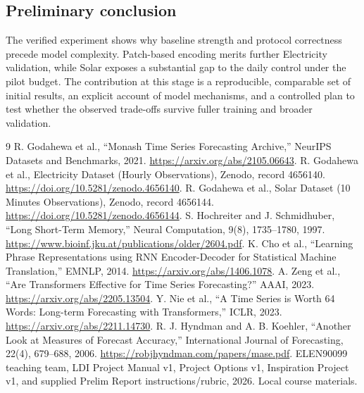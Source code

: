 \documentclass[10pt,a4paper]{article}
\begin{document}
\subsection{Preliminary conclusion}
The verified experiment shows why baseline strength and protocol correctness precede model complexity. Patch-based encoding merits further Electricity validation, while Solar exposes a substantial gap to the daily control under the pilot budget. The contribution at this stage is a reproducible, comparable set of initial results, an explicit account of model mechanisms, and a controlled plan to test whether the observed trade-offs survive fuller training and broader validation.
\clearpage
\begin{thebibliography}{9}\small
{} R. Godahewa et al., ``Monash Time Series Forecasting Archive,'' NeurIPS Datasets and Benchmarks, 2021. \url{https://arxiv.org/abs/2105.06643}.
 R. Godahewa et al., Electricity Dataset (Hourly Observations), Zenodo, record 4656140. \url{https://doi.org/10.5281/zenodo.4656140}.
 R. Godahewa et al., Solar Dataset (10 Minutes Observations), Zenodo, record 4656144. \url{https://doi.org/10.5281/zenodo.4656144}.
 S. Hochreiter and J. Schmidhuber, ``Long Short-Term Memory,'' Neural Computation, 9(8), 1735--1780, 1997. \url{https://www.bioinf.jku.at/publications/older/2604.pdf}.
 K. Cho et al., ``Learning Phrase Representations using RNN Encoder-Decoder for Statistical Machine Translation,'' EMNLP, 2014. \url{https://arxiv.org/abs/1406.1078}.
 A. Zeng et al., ``Are Transformers Effective for Time Series Forecasting?'' AAAI, 2023. \url{https://arxiv.org/abs/2205.13504}.
 Y. Nie et al., ``A Time Series is Worth 64 Words: Long-term Forecasting with Transformers,'' ICLR, 2023. \url{https://arxiv.org/abs/2211.14730}.
 R. J. Hyndman and A. B. Koehler, ``Another Look at Measures of Forecast Accuracy,'' International Journal of Forecasting, 22(4), 679--688, 2006. \url{https://robjhyndman.com/papers/mase.pdf}.
 ELEN90099 teaching team, LDI Project Manual v1, Project Options v1, Inspiration Project v1, and supplied Prelim Report instructions/rubric, 2026. Local course materials.
\end{thebibliography}
\end{document}
